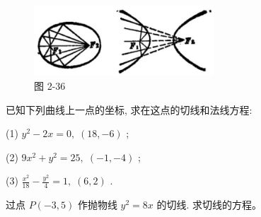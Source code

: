 \documentclass[lang=cn,newtx,10.5pt,scheme=chinese]{elegantbook}
\begin{document}
\begin{figure}[h]
  \centering
  \includegraphics[max width=0.6\textwidth]{images/01912cc2-ffb6-728e-9ae7-b113ff05c64b_124_448954.jpg}
  \caption{图 2-36}
\end{figure}



\begin{problemset}[练习]

\item 已知下列曲线上一点的坐标, 求在这点的切线和法线方程:

(1) \({y}^{2} - {2x} = 0,\;\left( {{18}, - 6}\right)\) ;

(2) \(9{x}^{2} + {y}^{2} = {25},\;\left( {-1, - 4}\right)\) ;

(3) \(\frac{{x}^{2}}{18} - \frac{{y}^{2}}{4} = 1,\;\left( {6,2}\right)\) .

\item 过点 \(P\left( {-3,5}\right)\) 作抛物线 \({y}^{2} = {8x}\) 的切线. 求切线的方程。

\end{problemset}
\end{document}
